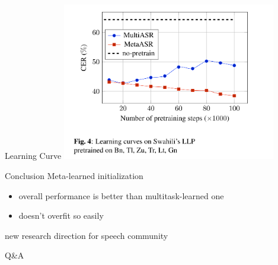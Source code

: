 \documentclass{beamer}
\begin{document}
\begin{frame}[t]{Learning Curve}
  \center \includegraphics[width=0.7\textwidth]{fig/lr.png}
\end{frame}

\begin{frame}[t]{Conclusion}
  Meta-learned initialization
  \begin{itemize}
    \item overall performance is better than multitask-learned one
    \item doesn't overfit so easily
  \end{itemize}
  \pause
  \vspace{3em}
  \center new research direction for speech community
\end{frame}





\begin{frame}
	\begin{center}
    \LARGE{Q\&A}
	\end{center}
\end{frame}



\end{document}
